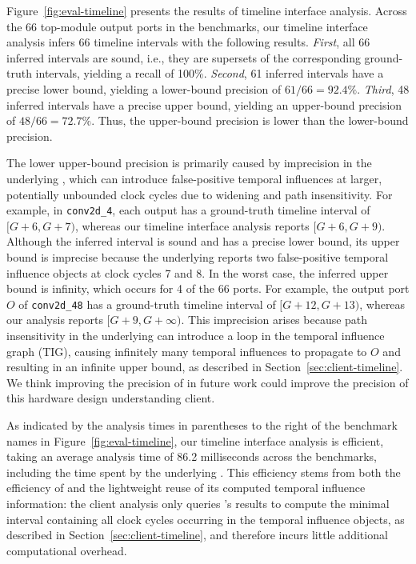 Figure~\ref{fig:eval-timeline} presents the results of timeline interface analysis.
Across the 66 top-module output ports in the benchmarks, our timeline interface analysis infers 66 timeline intervals with the following results.
\emph{First}, all 66 inferred intervals are sound, i.e., they are supersets of the corresponding ground-truth intervals, yielding a recall of 100\%.
\emph{Second}, 61 inferred intervals have a precise lower bound, yielding a lower-bound precision of $61/66 = 92.4\%$.
\emph{Third}, 48 inferred intervals have a precise upper bound, yielding an upper-bound precision of $48/66 = 72.7\%$.
Thus, the upper-bound precision is lower than the lower-bound precision.

The lower upper-bound precision is primarily caused by imprecision in the underlying \tia, which can introduce false-positive temporal influences at larger, potentially unbounded clock cycles due to widening and path insensitivity.
For example, in \texttt{conv2d\_4}, each output has a ground-truth timeline interval of $[G+6, G+7)$, whereas our timeline interface analysis reports $[G+6, G+9)$.
Although the inferred interval is sound and has a precise lower bound, its upper bound is imprecise because the underlying \tia reports two false-positive temporal influence objects at clock cycles 7 and 8.
In the worst case, the inferred upper bound is infinity, which occurs for 4 of the 66 ports.
For example, the output port $O$ of \texttt{conv2d\_48} has a ground-truth timeline interval of $[G+12, G+13)$, whereas our analysis reports $[G+9, G+\infty)$.
This imprecision arises because path insensitivity in the underlying \tia can introduce a loop in the temporal influence graph (TIG), causing infinitely many temporal influences to propagate to $O$ and resulting in an infinite upper bound, as described in Section~\ref{sec:client-timeline}.
We think improving the precision of \tia in future work could improve the precision of this hardware design understanding client.

As indicated by the analysis times in parentheses to the right of the benchmark names in Figure~\ref{fig:eval-timeline}, our timeline interface analysis is efficient, taking an average analysis time of 86.2 milliseconds across the benchmarks, including the time spent by the underlying \tia.
This efficiency stems from both the efficiency of \tia and the lightweight reuse of its computed temporal influence information: the client analysis only queries \tia's results to compute the minimal interval containing all clock cycles occurring in the temporal influence objects, as described in Section~\ref{sec:client-timeline}, and therefore incurs little additional computational overhead.
